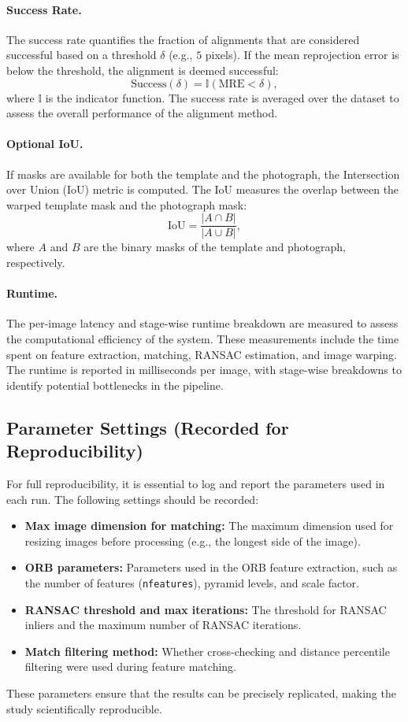 \paragraph{Success Rate.}
The success rate quantifies the fraction of alignments that are considered successful based on a threshold $\delta$ (e.g., $5$ pixels). If the mean reprojection error is below the threshold, the alignment is deemed successful:
\[
\text{Success}(\delta) = \mathbb{I}(\text{MRE} < \delta),
\]
where $\mathbb{I}$ is the indicator function. The success rate is averaged over the dataset to assess the overall performance of the alignment method.

\paragraph{Optional IoU.}
If masks are available for both the template and the photograph, the Intersection over Union (IoU) metric is computed. The IoU measures the overlap between the warped template mask and the photograph mask:
\[
\text{IoU} = \frac{|A \cap B|}{|A \cup B|},
\]
where $A$ and $B$ are the binary masks of the template and photograph, respectively.

\paragraph{Runtime.}
The per-image latency and stage-wise runtime breakdown are measured to assess the computational efficiency of the system. These measurements include the time spent on feature extraction, matching, RANSAC estimation, and image warping. The runtime is reported in milliseconds per image, with stage-wise breakdowns to identify potential bottlenecks in the pipeline.

\subsection{Parameter Settings (Recorded for Reproducibility)}
For full reproducibility, it is essential to log and report the parameters used in each run. The following settings should be recorded:
\begin{itemize}
  \item \textbf{Max image dimension for matching:} The maximum dimension used for resizing images before processing (e.g., the longest side of the image).
  \item \textbf{ORB parameters:} Parameters used in the ORB feature extraction, such as the number of features (\texttt{nfeatures}), pyramid levels, and scale factor.
  \item \textbf{RANSAC threshold and max iterations:} The threshold for RANSAC inliers and the maximum number of RANSAC iterations.
  \item \textbf{Match filtering method:} Whether cross-checking and distance percentile filtering were used during feature matching.
\end{itemize}

These parameters ensure that the results can be precisely replicated, making the study scientifically reproducible.
